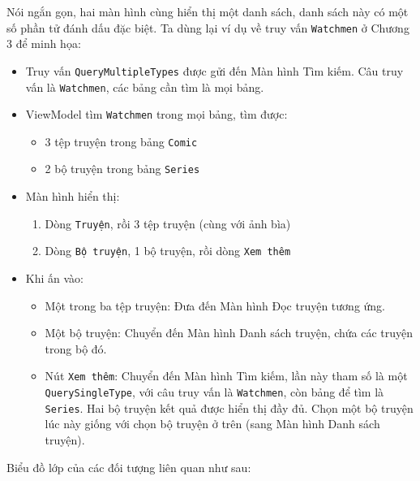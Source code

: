 \documentclass[
]{article}
\begin{document}
Nói ngắn gọn, hai màn hình cùng hiển thị một danh sách, danh sách này có
một số phần tử đánh dấu đặc biệt. Ta dùng lại ví dụ về truy vấn
\texttt{Watchmen} ở Chương 3 để minh họa:

\begin{itemize}
\item
  Truy vấn \texttt{QueryMultipleTypes} được gửi đến Màn hình Tìm kiếm.
  Câu truy vấn là \texttt{Watchmen}, các bảng cần tìm là mọi bảng.
\item
  ViewModel tìm \texttt{Watchmen} trong mọi bảng, tìm được:

  \begin{itemize}
    \item
    3 tệp truyện trong bảng \texttt{Comic}
  \item
    2 bộ truyện trong bảng \texttt{Series}
  \end{itemize}
\item
  Màn hình hiển thị:

  \begin{enumerate}
  \def\labelenumi{\arabic{enumi}.}
    \item
    Dòng \texttt{Truyện}, rồi 3 tệp truyện (cùng với ảnh bìa)
  \item
    Dòng \texttt{Bộ\ truyện}, 1 bộ truyện, rồi dòng \texttt{Xem\ thêm}
  \end{enumerate}
\item
  Khi ấn vào:

  \begin{itemize}
    \item
    Một trong ba tệp truyện: Đưa đến Màn hình Đọc truyện tương ứng.
  \item
    Một bộ truyện: Chuyển đến Màn hình Danh sách truyện, chứa các truyện
    trong bộ đó.
  \item
    Nút \texttt{Xem\ thêm}: Chuyển đến Màn hình Tìm kiếm, lần này tham
    số là một \texttt{QuerySingleType}, với câu truy vấn là
    \texttt{Watchmen}, còn bảng để tìm là \texttt{Series}. Hai bộ truyện
    kết quả được hiển thị đầy đủ. Chọn một bộ truyện lúc này giống với
    chọn bộ truyện ở trên (sang Màn hình Danh sách truyện).
  \end{itemize}
\end{itemize}

Biểu đồ lớp của các đối tượng liên quan như sau:
\end{document}
